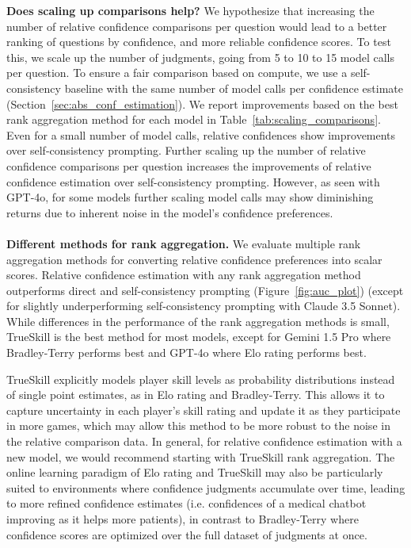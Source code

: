 \noindent \textbf{Does scaling up comparisons help?} We hypothesize that increasing the number of relative confidence comparisons per question would lead to a better ranking of questions by confidence, and more reliable confidence scores. To test this, we scale up the number of judgments, going from 5 to 10 to 15 model calls per question. To ensure a fair comparison based on compute, we use a self-consistency baseline with the same number of model calls per confidence estimate (Section~\ref{sec:abs_conf_estimation}). We report improvements based on the best rank aggregation method for each model in Table~\ref{tab:scaling_comparisons}.
Even for a small number of model calls, relative confidences show improvements over self-consistency prompting. Further scaling up the number of relative confidence comparisons per question increases the improvements of relative confidence estimation over self-consistency prompting. However, as seen with GPT-4o, for some models further scaling model calls may show diminishing returns due to inherent noise in the model’s confidence preferences.
\\\\
\noindent \textbf{Different methods for rank aggregation.} We evaluate multiple rank aggregation methods for converting relative confidence preferences into scalar scores. Relative confidence estimation with any rank aggregation method outperforms direct and self-consistency prompting (Figure~\ref{fig:auc_plot}) (except for slightly underperforming self-consistency prompting with Claude 3.5 Sonnet). While differences in the performance of the rank aggregation methods is small, TrueSkill is the best method for most models, except for Gemini 1.5 Pro where Bradley-Terry performs best and GPT-4o where Elo rating performs best. 

TrueSkill explicitly models player skill levels as probability distributions instead of single point estimates, as in Elo rating and Bradley-Terry. This allows it to capture uncertainty in each player’s skill rating and update it as they participate in more games, which may allow this method to be more robust to the noise in the relative comparison data. In general, for relative confidence estimation with a new model, we would recommend starting with TrueSkill rank aggregation. The online learning paradigm of Elo rating and TrueSkill may also be particularly suited to environments where confidence judgments accumulate over time, leading to more refined confidence estimates (i.e. confidences of a medical chatbot improving as it helps more patients), in contrast to Bradley-Terry where confidence scores are optimized over the full dataset of judgments at once.
